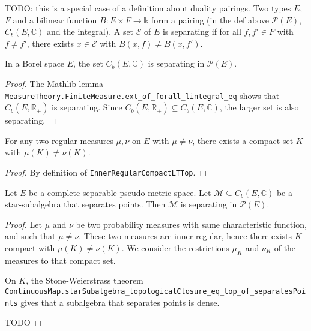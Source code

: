 TODO: this is a special case of a definition about duality pairings. Two types $E$, $F$ and a bilinear function $B : E \times F \to \mathbb{k}$ form a pairing (in the def above $\mathcal P(E)$, $C_b(E, \mathbb{C})$ and the integral). A set $\mathcal E$ of $E$ is separating if for all $f, f' \in F$ with $f \ne f'$, there exists $x \in \mathcal E$ with $B(x, f) \ne B(x, f')$. 

\begin{lemma}\label{lem:bounded_continuous_separating}
In a Borel space $E$, the set $C_b(E, \mathbb{C})$ is separating in $\mathcal P(E)$.
\end{lemma}

\begin{proof}
The Mathlib lemma \texttt{MeasureTheory.FiniteMeasure.ext\_of\_forall\_lintegral\_eq} shows that $C_b(E, \mathbb{R}_+)$ is separating. Since $C_b(E, \mathbb{R}_{+}) \subseteq C_b(E, \mathbb{C})$, the larger set is also separating.
\end{proof}

\begin{lemma}\label{lem:innerRegular_ne_iff_compact}
For any two regular measures $\mu, \nu$ on $E$ with $\mu \ne \nu$, there exists a compact set $K$ with $\mu(K) \ne \nu(K)$.
\end{lemma}

\begin{proof}
By definition of \texttt{InnerRegularCompactLTTop}.
\end{proof}

\begin{theorem}\label{thm:separating_starSubalgebra}
Let $E$ be a complete separable pseudo-metric space. Let $\mathcal M \subseteq C_b(E, \mathbb{C})$ be a star-subalgebra that separates points. Then $\mathcal M$ is separating in $\mathcal P(E)$.
\end{theorem}

\begin{proof}
Let $\mu$ and $\nu$ be two probability measures with same characteristic function, and such that $\mu \ne \nu$.
These two measures are inner regular, hence there exists $K$ compact with $\mu(K) \ne \nu(K)$.
We consider the restrictions $\mu_K$ and $\nu_K$ of the measures to that compact set.

On $K$, the Stone-Weierstrass theorem \texttt{ContinuousMap.starSubalgebra\_topologicalClosure\_eq\_top\_of\_separatesPoints} gives that a subalgebra that separates points is dense.

TODO
\end{proof}

